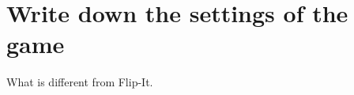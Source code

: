 \documentclass[10pt]{article}
\begin{document}
\section{Write down the settings of the game}

What is different from Flip-It.

\end{document}
